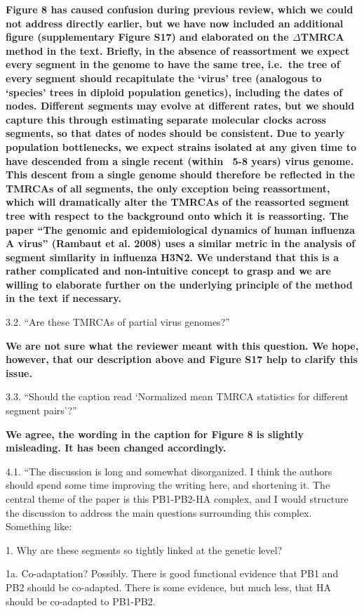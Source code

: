 \documentclass[11pt,oneside,letterpaper]{article}
\begin{document}
\textbf{Figure 8 has caused confusion during previous review, which we could not address directly earlier, but we have now included an additional figure (supplementary Figure S17) and elaborated on the $\Delta$TMRCA method in the text.
Briefly, in the absence of reassortment we expect every segment in the genome to have the same tree, i.e.\ the tree of every segment should recapitulate the `virus' tree (analogous to `species' trees in diploid population genetics), including the dates of nodes.
Different segments may evolve at different rates, but we should capture this through estimating separate molecular clocks across segments, so that dates of nodes should be consistent.
Due to yearly population bottlenecks, we expect strains isolated at any given time to have descended from a single recent (within ~5-8 years) virus genome.
This descent from a single genome should therefore be reflected in the TMRCAs of all segments, the only exception being reassortment, which will dramatically alter the TMRCAs of the reassorted segment tree with respect to the background onto which it is reassorting.
The paper ``The genomic and epidemiological dynamics of human influenza A virus'' (Rambaut et al. 2008) uses a similar metric in the analysis of segment similarity in influenza H3N2.
We understand that this is a rather complicated and non-intuitive concept to grasp and we are willing to elaborate further on the underlying principle of the method in the text if necessary.}

3.2. ``Are these TMRCAs of partial virus genomes?''

\textbf{We are not sure what the reviewer meant with this question.
We hope, however, that our description above and Figure S17 help to clarify this issue.}

3.3. ``Should the caption read `Normalized mean TMRCA statistics for different segment pairs'?''

\textbf{We agree, the wording in the caption for Figure 8 is slightly misleading. It has been changed accordingly.}

4.1. ``The discussion is long and somewhat disorganized.
I think the authors should spend some time improving the writing here, and shortening it.
The central theme of the paper is this PB1-PB2-HA complex, and I would structure the discussion to address the main questions surrounding this complex.  
Something like:

1.  Why are these segments so tightly linked at the genetic level?

1a.  Co-adaptation?
Possibly.
There is good functional evidence that PB1 and PB2 should be co-adapted.
There is some evidence, but much less, that HA should be co-adapted to PB1-PB2.
\end{document}

